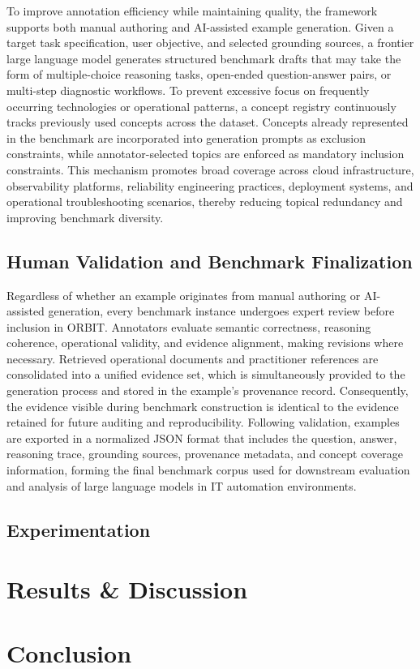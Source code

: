 \documentclass[conference]{IEEEtran}
\begin{document}
To improve annotation efficiency while maintaining quality, the framework supports both manual authoring and AI-assisted example generation. Given a target task specification, user objective, and selected grounding sources, a frontier large language model generates structured benchmark drafts that may take the form of multiple-choice reasoning tasks, open-ended question-answer pairs, or multi-step diagnostic workflows. To prevent excessive focus on frequently occurring technologies or operational patterns, a concept registry continuously tracks previously used concepts across the dataset. Concepts already represented in the benchmark are incorporated into generation prompts as exclusion constraints, while annotator-selected topics are enforced as mandatory inclusion constraints. This mechanism promotes broad coverage across cloud infrastructure, observability platforms, reliability engineering practices, deployment systems, and operational troubleshooting scenarios, thereby reducing topical redundancy and improving benchmark diversity.

\subsection{Human Validation and Benchmark Finalization}

Regardless of whether an example originates from manual authoring or AI-assisted generation, every benchmark instance undergoes expert review before inclusion in ORBIT. Annotators evaluate semantic correctness, reasoning coherence, operational validity, and evidence alignment, making revisions where necessary. Retrieved operational documents and practitioner references are consolidated into a unified evidence set, which is simultaneously provided to the generation process and stored in the example's provenance record. Consequently, the evidence visible during benchmark construction is identical to the evidence retained for future auditing and reproducibility. Following validation, examples are exported in a normalized JSON format that includes the question, answer, reasoning trace, grounding sources, provenance metadata, and concept coverage information, forming the final benchmark corpus used for downstream evaluation and analysis of large language models in IT automation environments.

\subsection{Experimentation}

\section{Results \& Discussion}\label{sec6}
\section{Conclusion}\label{sec7}



\end{document}
